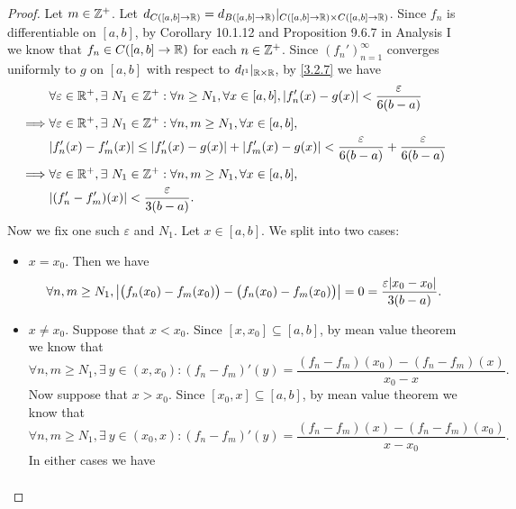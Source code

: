 \begin{proof}
  Let \(m \in \mathbb{Z}^+\).
  Let \(d_{C([a, b] \to \mathbb{R})} = d_{B([a, b] \to \mathbb{R})}|_{C([a, b] \to \mathbb{R}) \times C([a, b] \to \mathbb{R})}\).
  Since \(f_n\) is differentiable on \([a, b]\), by Corollary 10.1.12 and Proposition 9.6.7 in Analysis I we know that \(f_n \in C([a, b] \to \mathbb{R})\) for each \(n \in \mathbb{Z}^+\).
  Since \((f_n')_{n = 1}^\infty\) converges uniformly to \(g\) on \([a, b]\) with respect to \(d_{l^1}|_{\mathbb{R} \times \mathbb{R}}\), by \cref{3.2.7} we have
  \begin{align*}
             & \forall \varepsilon \in \R^+, \exists\ N_1 \in \Z^+ : \forall n \geq N_1, \forall x \in [a, b], \abs{f_n'(x) - g(x)} < \dfrac{\varepsilon}{6(b - a)} \\
    \implies & \forall \varepsilon \in \R^+, \exists\ N_1 \in \Z^+ : \forall n, m \geq N_1, \forall x \in [a, b],                                                   \\
             & \abs{f_n'(x) - f_m'(x)} \leq \abs{f_n'(x) - g(x)} + \abs{f_m'(x) - g(x)} < \dfrac{\varepsilon}{6(b - a)} + \dfrac{\varepsilon}{6(b - a)}             \\
    \implies & \forall \varepsilon \in \R^+, \exists\ N_1 \in \Z^+ : \forall n, m \geq N_1, \forall x \in [a, b],                                                   \\
             & \abs{(f_n' - f_m')(x)} < \dfrac{\varepsilon}{3(b - a)}.
  \end{align*}
  Now we fix one such \(\varepsilon\) and \(N_1\).
  Let \(x \in [a, b]\).
  We split into two cases:
  \begin{itemize}
    \item \(x = x_0\).
          Then we have
          \[
            \forall n, m \geq N_1, \abs{\big(f_n(x_0) - f_m(x_0)\big) - \big(f_n(x_0) - f_m(x_0)\big)} = 0 = \dfrac{\varepsilon \abs{x_0 - x_0}}{3(b - a)}.
          \]
    \item \(x \neq x_0\).
          Suppose that \(x < x_0\).
          Since \([x, x_0] \subseteq [a, b]\), by mean value theorem we know that
          \[
            \forall n, m \geq N_1, \exists\ y \in (x, x_0) : (f_n - f_m)'(y) = \dfrac{(f_n - f_m)(x_0) - (f_n - f_m)(x)}{x_0 - x}.
          \]
          Now suppose that \(x > x_0\).
          Since \([x_0, x] \subseteq [a, b]\), by mean value theorem we know that
          \[
            \forall n, m \geq N_1, \exists\ y \in (x_0, x) : (f_n - f_m)'(y) = \dfrac{(f_n - f_m)(x) - (f_n - f_m)(x_0)}{x - x_0}.
          \]
          In either cases we have
          \begin{align*}

\end{align*}
\end{itemize}
\end{proof}
